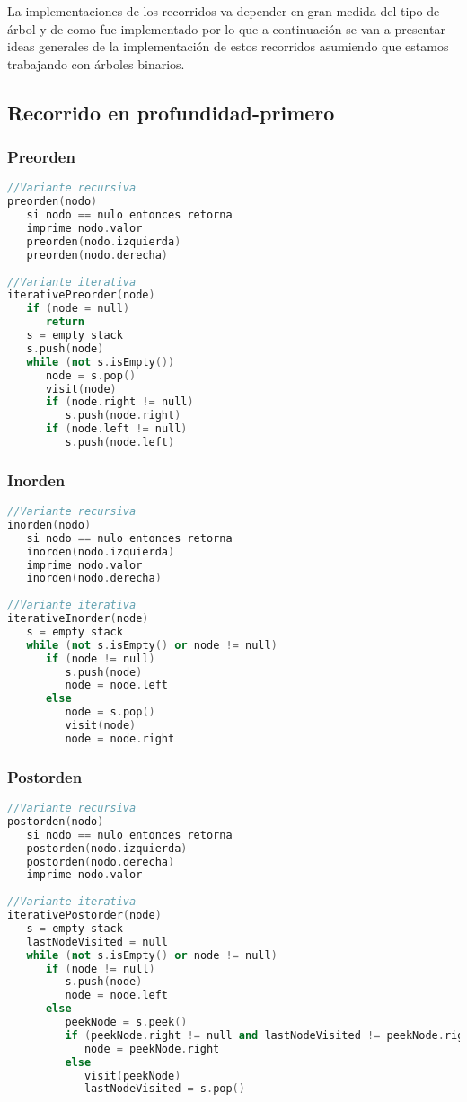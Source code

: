 La implementaciones de los recorridos va depender en gran medida del tipo de árbol y de como fue implementado por lo que a continuación se van a presentar ideas generales de la implementación de estos recorridos asumiendo que estamos trabajando con árboles binarios.

\subsection{Recorrido en profundidad-primero}

\subsubsection{Preorden}

\begin{lstlisting}[language=C++]
//Variante recursiva 
preorden(nodo)
   si nodo == nulo entonces retorna
   imprime nodo.valor
   preorden(nodo.izquierda)
   preorden(nodo.derecha)
   
//Variante iterativa
iterativePreorder(node)
   if (node = null)
      return
   s = empty stack
   s.push(node)
   while (not s.isEmpty())
      node = s.pop()
      visit(node)
      if (node.right != null)
         s.push(node.right)
      if (node.left != null)
         s.push(node.left)   
\end{lstlisting}

\subsubsection{Inorden}

\begin{lstlisting}[language=C++]
//Variante recursiva 
inorden(nodo)
   si nodo == nulo entonces retorna
   inorden(nodo.izquierda)
   imprime nodo.valor
   inorden(nodo.derecha)
   
//Variante iterativa
iterativeInorder(node)
   s = empty stack
   while (not s.isEmpty() or node != null)
      if (node != null)
         s.push(node)
         node = node.left
      else
         node = s.pop()
         visit(node)
         node = node.right
\end{lstlisting}

\subsubsection{Postorden}

\begin{lstlisting}[language=C++]
//Variante recursiva 
postorden(nodo)
   si nodo == nulo entonces retorna
   postorden(nodo.izquierda)
   postorden(nodo.derecha)
   imprime nodo.valor
   
//Variante iterativa
iterativePostorder(node)
   s = empty stack
   lastNodeVisited = null
   while (not s.isEmpty() or node != null)
      if (node != null)
         s.push(node)
         node = node.left
      else
         peekNode = s.peek()
         if (peekNode.right != null and lastNodeVisited != peekNode.right)
            node = peekNode.right
         else
            visit(peekNode)
            lastNodeVisited = s.pop()
\end{lstlisting}

